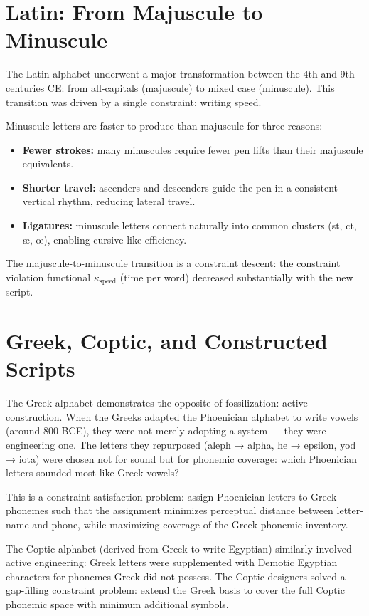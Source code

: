 \section{Latin: From Majuscule to Minuscule}

The Latin alphabet underwent a major transformation between the 4th and
9th centuries CE: from all-capitals (majuscule) to mixed case (minuscule).
This transition was driven by a single constraint: writing speed.

Minuscule letters are faster to produce than majuscule for three reasons:
\begin{itemize}
  \item \textbf{Fewer strokes:} many minuscules require fewer pen lifts
        than their majuscule equivalents.
  \item \textbf{Shorter travel:} ascenders and descenders guide the pen
        in a consistent vertical rhythm, reducing lateral travel.
  \item \textbf{Ligatures:} minuscule letters connect naturally into
        common clusters (st, ct, æ, œ), enabling cursive-like efficiency.
\end{itemize}

The majuscule-to-minuscule transition is a constraint descent: the
constraint violation functional $\kappa_\text{speed}$ (time per word)
decreased substantially with the new script.

\section{Greek, Coptic, and Constructed Scripts}

The Greek alphabet demonstrates the opposite of fossilization: active
construction. When the Greeks adapted the Phoenician alphabet to write
vowels (around 800 BCE), they were not merely adopting a system —
they were engineering one. The letters they repurposed (aleph → alpha,
he → epsilon, yod → iota) were chosen not for sound but for phonemic
coverage: which Phoenician letters sounded most like Greek vowels?

This is a constraint satisfaction problem: assign Phoenician letters
to Greek phonemes such that the assignment minimizes perceptual
distance between letter-name and phone, while maximizing coverage of
the Greek phonemic inventory.

The Coptic alphabet (derived from Greek to write Egyptian) similarly
involved active engineering: Greek letters were supplemented with
Demotic Egyptian characters for phonemes Greek did not possess.
The Coptic designers solved a gap-filling constraint problem: extend
the Greek basis to cover the full Coptic phonemic space with
minimum additional symbols.

